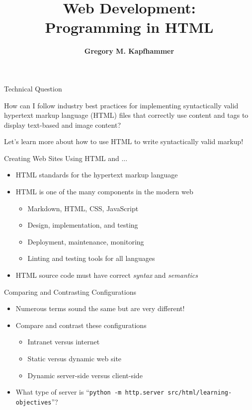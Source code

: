 \documentclass[14pt,aspectratio=169]{beamer}
\title{Web Development: \\ Programming in HTML}
\author{{\bf Gregory M. Kapfhammer}}
\institute[shortinst]{{\bf Department of Computer Science, Allegheny College}}
\begin{document}
{
  \begin{frame}
    \titlepage
  \end{frame}
}

%
\begin{frame}{Technical Question}
  \hspace*{.25in}
  \vspace*{.2in}
  \begin{center}
    {\large How can I follow industry best practices for implementing
      syntactically valid hypertext markup language (HTML) files that correctly
    use content and tags to display text-based and image content?}
  \end{center}
  \vspace{1ex}
  \begin{center}
    \small Let's learn more about how to use HTML to write syntactically valid markup!
  \end{center}
\end{frame}

%
\begin{frame}{Creating Web Sites Using HTML and ...}
%
  \begin{itemize}
    \item HTML standards for the hypertext markup language
    \item HTML is one of the many components in the modern web
      \begin{itemize}
        \item Markdown, HTML, CSS, JavaScript
        \item Design, implementation, and testing
        \item Deployment, maintenance, monitoring
        \item Linting and testing tools for all languages
      \end{itemize}
    \item HTML source code must have correct {\em syntax} and {\em semantics}
  \end{itemize}
%
\end{frame}

%
\begin{frame}{Comparing and Contrasting Configurations}
%
  \begin{itemize}
    \item Numerous terms sound the same but are very different!
    \item Compare and contrast these configurations
      \begin{itemize}
        \item Intranet versus internet
        \item Static versus dynamic web site
        \item Dynamic server-side versus client-side
      \end{itemize}
    \item What type of server is ``{\tt python -m http.server
      src/html/learning-objectives}''?
  \end{itemize}
%
\end{frame}
\end{document}
